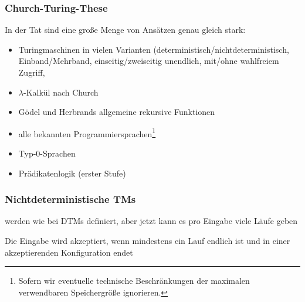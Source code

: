 \documentclass[aspectratio=1610,onlymath]{beamer}
\begin{document}
\begin{frame}\frametitle{Church-Turing-These}


In der Tat sind eine große Menge von Ansätzen genau gleich stark:
\begin{itemize}
\item Turingmaschinen in vielen Varianten (deterministisch/nichtdeterministisch, Einband/Mehrband,
einseitig/zweiseitig unendlich, mit/ohne wahlfreiem Zugriff, \ghost{\ldots)}
\item $\lambda$-Kalkül nach Church
\item Gödel und Herbrands allgemeine rekursive Funktionen
\item alle bekannten Programmiersprachen\footnote{Sofern wir eventuelle technische Beschränkungen der maximalen verwendbaren Speichergröße ignorieren.}
\item Typ-0-Sprachen
\item Prädikatenlogik (erster Stufe)
\end{itemize}

\end{frame}


\begin{frame}\frametitle{Nichtdeterministische TMs}

\medskip

 werden wie bei DTMs definiert, aber jetzt kann es pro Eingabe viele Läufe geben
\medskip

Die Eingabe wird akzeptiert, wenn mindestens ein Lauf endlich ist und in einer akzeptierenden Konfiguration endet

\end{frame}
\end{document}

